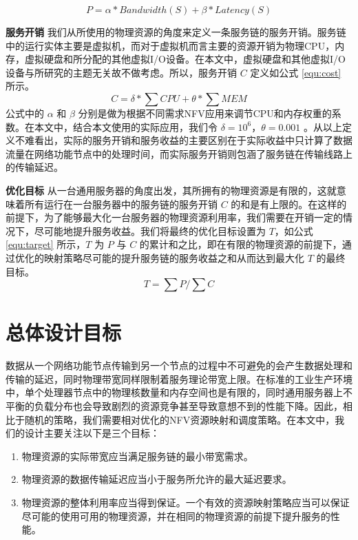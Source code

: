 \begin{equation}
\label{equ:profit}
P = \alpha*Bandwidth(S) + \beta* Latency(S)
\end{equation}

\textbf{服务开销}{ }我们从所使用的物理资源的角度来定义一条服务链的服务开销。服务链中的运行实体主要是虚拟机，而对于虚拟机而言主要的资源开销为物理CPU，内存，虚拟硬盘和所分配的其他虚拟I/O设备。在本文中，虚拟硬盘和其他虚拟I/O设备与所研究的主题无关故不做考虑。所以，服务开销 $C$ 定义如公式 \ref{equ:cost} 所示。
\begin{equation}
\label{equ:cost}
C = \delta * \sum{CPU} + \theta *\sum{MEM} 
\end{equation}
公式中的 $\alpha$ 和 $\beta$ 分别是做为根据不同需求NFV应用来调节CPU和内存权重的系数。在本文中，结合本文使用的实际应用，我们令 $\delta = 10^{6}$，$\theta = 0.001$ 。从以上定义不难看出，实际的服务开销和服务收益的主要区别在于实际收益中只计算了数据流量在网络功能节点中的处理时间，而实际服务开销则包涵了服务链在传输线路上的传输延迟。

\textbf{优化目标}{ }从一台通用服务器的角度出发，其所拥有的物理资源是有限的，这就意味着所有运行在一台服务器中的服务链的服务开销 $C$ 的和是有上限的。在这样的前提下，为了能够最大化一台服务器的物理资源利用率，我们需要在开销一定的情况下，尽可能地提升服务收益。我们将最终的优化目标设置为 $T$，如公式 \ref{equ:target} 所示，$T$ 为 $P$ 与 $C$ 的累计和之比，即在有限的物理资源的前提下，通过优化的映射策略尽可能的提升服务链的服务收益之和从而达到最大化 $T$ 的最终目标。
\begin{equation}
\label{equ:target}
T = \sum P / \sum C  
\end{equation}

\section{总体设计目标}
数据从一个网络功能节点传输到另一个节点的过程中不可避免的会产生数据处理和传输的延迟，同时物理带宽同样限制着服务理论带宽上限。在标准的工业生产环境中，单个处理器节点中的物理核数量和内存空间也是有限的，同时通用服务器上不平衡的负载分布也会导致剧烈的资源竞争甚至导致意想不到的性能下降。因此，相比于随机的策略，我们需要相对优化的NFV资源映射和调度策略。在本文中，我们的设计主要关注以下是三个目标：
\begin{enumerate}
	\item 物理资源的实际带宽应当满足服务链的最小带宽需求。
	\item 物理资源的数据传输延迟应当小于服务所允许的最大延迟要求。
	\item 物理资源的整体利用率应当得到保证。一个有效的资源映射策略应当可以保证尽可能的使用可用的物理资源，并在相同的物理资源的前提下提升服务的性能。
\end{enumerate}

